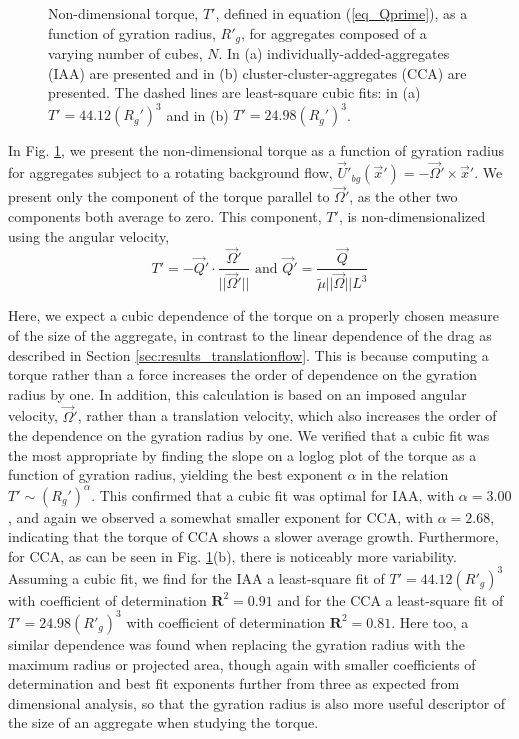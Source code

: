 \begin{figure}[ht]
	\begin{center}
	\end{center}
	\caption{Non-dimensional torque, $T'$, defined in equation (\ref{eq_Qprime}), as a function of gyration radius, $R'_g$, for aggregates composed of a varying number of cubes, $N$. In (a)  individually-added-aggregates (IAA) are presented and in (b) cluster-cluster-aggregates (CCA) are presented.	The dashed lines are least-square cubic fits: in (a) $T' = 44.12 (R_g')^3$ and in (b) $T' = 24.98 (R_g')^3$.}
	\label{fig_torque}
\end{figure}
In Fig. \ref{fig_torque}, we present the non-dimensional torque as a function of gyration radius for aggregates subject to a rotating background flow, $\vec{U}'_{bg}(\vec{x}') = -\vec{\Omega}' \times \vec{x}'$. We present only the component of the torque parallel to $\vec{\Omega}'$, as the other two components both average to zero. This component, $T'$, is non-dimensionalized using the angular velocity, 
\begin{equation}
T' = -\vec{Q}' \cdot \frac{\vec{\Omega}'}{||\vec{\Omega}' ||}  \text{\ \ \ and \ \ \ } \vec{Q}' = \frac{  \vec{Q} } {\tilde{\mu} ||\vec{\Omega}  || L^3 } 
\label{eq_Qprime}
\end{equation}


Here, we expect a cubic dependence of the torque on a properly chosen measure of the size of the aggregate, 
 in contrast to the linear dependence of the drag as described in Section 
\ref{sec:results_translationflow}. 
This is because computing a torque rather than a force increases the order of dependence on the gyration radius by one. In addition, this calculation is  based on an imposed angular velocity, $\vec{\Omega}'$, rather than a translation velocity, which also increases the order of the dependence on the gyration radius by one.
We verified that a cubic fit was the most appropriate by finding the slope on a loglog plot of the torque as a function of gyration radius, yielding  the best exponent $\alpha$ in the relation $T' \sim (R_g')^\alpha$. This confirmed that a cubic fit was optimal for IAA, with $\alpha=3.00$, and again we observed a somewhat smaller exponent for CCA, with $\alpha=2.68$, indicating that the torque of CCA shows a slower average growth.  Furthermore, for CCA, as can be seen in Fig. \ref{fig_torque}(b), there is noticeably more variability.
Assuming a cubic fit, we find for the IAA a least-square fit of $T' = 44.12 (R'_g)^3$ with coefficient of determination $\mathbf{R}^2=0.91$ and for the CCA a least-square fit of $T' = 24.98 (R'_g)^3$ with coefficient of determination $\mathbf{R}^2=0.81$. Here too, a similar dependence was found when replacing the gyration radius with the maximum radius or projected area, though again with smaller coefficients of determination and best fit exponents further from three as expected from dimensional analysis, so that the gyration radius is also more useful descriptor of the size of an aggregate when studying the torque.


